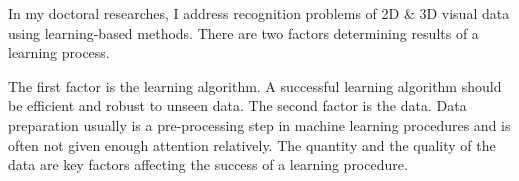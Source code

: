 \documentclass{iitthesis}
\begin{document}
 \label{sec: contribution}

%

In my doctoral researches, I address recognition problems of 2D \& 3D visual data using learning-based methods. There are two factors determining results of a learning process. 

The first factor is the learning algorithm. A successful learning algorithm should be efficient and robust to unseen data. The second factor is the data. Data preparation usually is a pre-processing step in machine learning procedures and is often not given enough attention relatively. The quantity and the quality of the data are key factors affecting the success of a learning procedure. 
\end{document}
